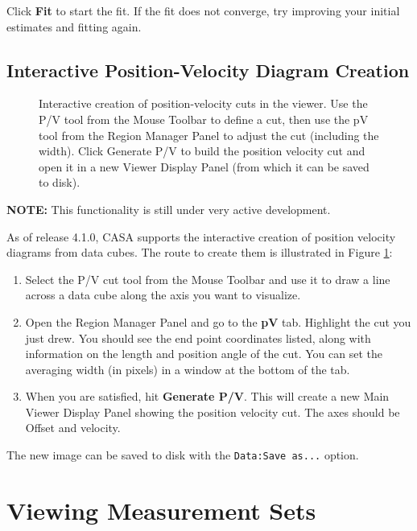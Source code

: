 Click {\bf Fit} to start the fit. If the fit does not converge, try improving your initial estimates and fitting again.

\subsection{Interactive Position-Velocity Diagram Creation}
\label{section:display.image.pvdiagram}

\begin{figure}[h!]
\begin{center}
\caption{\label{fig:viewer_pvcut} Interactive creation of position-velocity cuts in the viewer. Use the P/V tool from the Mouse Toolbar to
define a cut, then use the pV tool from the Region Manager Panel to adjust the cut (including the width). Click Generate P/V to build
the position velocity cut and open it in a new Viewer Display Panel (from which it can be saved to disk).}
\hrulefill
\end{center}
\end{figure}

{\bf NOTE:} This functionality is still under very active development.

As of release 4.1.0, CASA supports the interactive creation of position velocity diagrams from data cubes. The route to create them
is illustrated in Figure \ref{fig:viewer_pvcut}:

\begin{enumerate}
\item Select the P/V cut tool from the Mouse Toolbar and use it to draw a line across a data cube along the axis you want to visualize.
\item Open the Region Manager Panel and go to the {\bf pV} tab.  Highlight the cut you just drew. You should see the end point coordinates
listed, along with information on the length and position angle of the cut. You can set the averaging width (in pixels) in a window at the bottom
of the tab.
\item When you are satisfied, hit {\bf Generate P/V}. This will create a new Main Viewer Display Panel showing the position velocity cut. The axes should
be Offset and velocity.
\end{enumerate}

The new image can be saved to disk with the {\tt Data:Save as...} option.

\section{Viewing Measurement Sets}
\label{section:display.ms}

